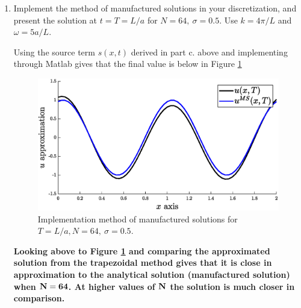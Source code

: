 \pagebreak
\begin{enumerate}[label=\alph*., start = 3]
    \item Implement the method of manufactured solutions in your discretization, and present the solution at $t=T=L/a$ for $N= 64,\ \sigma= 0.5$. Use $k=4\pi/L$ and $\omega = 5a/L$.
    
    Using the source term $s(x,t)$ derived in part c. above and implementing through Matlab gives that the final value is below in Figure \ref{fig:q3c}

    \begin{figure}[h]
        \centering
        \includegraphics[width = 0.9\linewidth]{q3/q3c.eps}
        \caption{Implementation method of manufactured solutions for $T=L/a, N=64,\ \sigma=0.5$.}
        \label{fig:q3c}
    \end{figure}
    
    \begin{fminipage}{0.9\linewidth}
        \textbf{Looking above to Figure \ref{fig:q3c} and comparing the approximated solution from the trapezoidal method gives that it is close in approximation to the analytical solution (manufactured solution) when $\bf N=64$. At higher values of $\bf N$ the solution is much closer in comparison.}
    \end{fminipage}
    
\end{enumerate}

